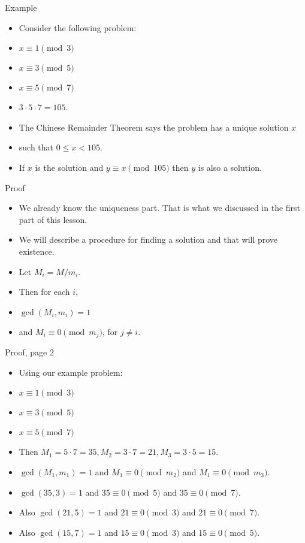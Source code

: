 \documentclass{beamer}
\begin{document}
\begin{frame}{Example}

\begin{itemize}
  \item Consider the following problem:
  \item $x \equiv 1 \pmod 3$
  \item $x \equiv 3 \pmod 5$
  \item $x \equiv 5 \pmod 7$
  \item $3\cdot 5 \cdot 7 = 105$.
  \item The Chinese Remainder Theorem says the problem has a unique solution $x$
  \item such that $0\leq x < 105$.
  \item If $x$ is the solution and $y\equiv x \pmod {105}$ then $y$ is also a solution.
\end{itemize}

\end{frame}

\begin{frame}{Proof}

\begin{itemize}
  \item We already know the uniqueness part. That is what we discussed in the first part of this lesson.
  \item We will describe a procedure for finding a solution and that will prove existence.
  \item Let $M_i = M/{m_i}$.
  \item Then for each $i$,
  \item $\gcd(M_i, m_i) = 1$
  \item and $M_i \equiv 0 \pmod {m_j}$, for $j\not= i$.

\end{itemize}

\end{frame}

\begin{frame}{Proof, page 2}

\begin{itemize}
  \item Using our example problem:
  \item $x \equiv 1 \pmod 3$
  \item $x \equiv 3 \pmod 5$
  \item $x \equiv 5 \pmod 7$
  \item Then $M_1 = 5\cdot 7 = 35, M_2 = 3\cdot 7 = 21, M_3 = 3\cdot 5 = 15$.
  \item $\gcd(M_1, m_1) = 1$ and $M_1 \equiv 0 \pmod {m_2}$ and $M_1 \equiv 0 \pmod {m_3}$.
  \item $\gcd(35,3) = 1$ and $35\equiv 0 \pmod 5$ and $35 \equiv 0 \pmod 7$.
  \item Also $\gcd(21,5) = 1$ and $21\equiv 0 \pmod 3$ and $21 \equiv 0 \pmod 7$.
  \item Also $\gcd(15,7) = 1$ and $15\equiv 0 \pmod 3$ and $15 \equiv 0 \pmod 5$.

\end{itemize}

\end{frame}
\end{document}
